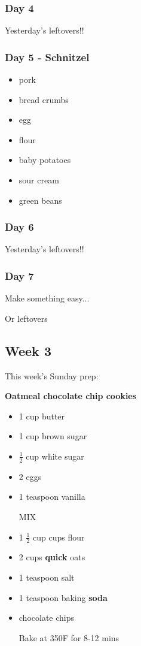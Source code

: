 \documentclass[11pt, a4paper]{article}
\begin{document}
\subsubsection{Day 4}
\vspace{1pc}
Yesterday's leftovers!!

\subsubsection{Day 5 - Schnitzel}
\vspace{1pc}
\begin{itemize}
\item pork
\item bread crumbs
\item egg
\item flour
\item baby potatoes
\item sour cream
\item green beans
\end{itemize}

\subsubsection{Day 6}
\vspace{1pc}
Yesterday's leftovers!!

\subsubsection{Day 7}
\vspace{1pc}
\noindent Make something easy...
\par
Or leftovers


\vspace{0.917 pc} %


\pagebreak
\subsection{Week 3}

This week's Sunday prep:
\par
\vspace{1pc}
\noindent\textbf{Oatmeal chocolate chip cookies}
\par

\begin{itemize}
\item 1 cup butter
\item 1 cup brown sugar
\item $\frac{1}{2}$ cup white sugar
\item 2 eggs
\item 1 teaspoon vanilla
\par
MIX
\item 1 $\frac{1}{2}$ cup cups flour
\item 2 cups \textbf{quick} oats
\item 1 teaspoon salt
\item 1 teaspoon baking \textbf{soda}
\item chocolate chips
\par
Bake at 350F for 8-12 mins
\end{itemize}
\end{document}
